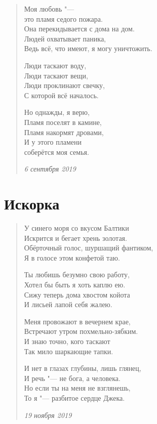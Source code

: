 \documentclass[a4paper,12pt]{article}
\begin{document}
\begin{verse}
Моя любовь "---\\
это пламя седого пожара.\\
Она перекидывается с дома на дом.\\
Людей охватывает паника,\\
Ведь всё, что имеют, я могу уничтожить.

Люди таскают воду,\\
Люди таскают вещи,\\
Люди проклинают свечку,\\
С которой всё началось.

Но однажды, я верю,\\
Пламя поселят в камине,\\
Пламя накормят дровами,\\
И у этого пламени\\
соберётся моя семья.

\emph{6 сентября 2019}
\end{verse}
\newpage

\section{Искорка}

\begin{verse}
У синего моря со вкусом Балтики\\
Искрится и бегает хрень золотая.\\
Обёрточный голос, шуршащий фантиком,\\
Я в голосе этом конфетой таю.

Ты любишь безумно свою работу,\\
Хотел бы быть я хоть каплю ею.\\
Сижу теперь дома хвостом койота\\
И лисьей лапой себя жалею.

Меня провожают в вечернем крае,\\
Встречают утром похмельно-зябким.\\
И знаю точно, кого таскают\\
Так мило шаркающие тапки.

И нет в глазах глубины, лишь глянец,\\
И речь "--- не бога, а человека.\\
Но если ты на меня не взглянешь,\\
То я "--- разбитое сердце Джека.

\emph{19 ноября 2019}
\end{verse} 
\newpage
\end{document}
